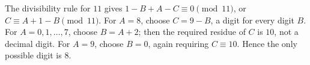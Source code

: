 The divisibility rule for $11$ gives $1-B+A-C\equiv0\pmod{11}$, or $C\equiv A+1-B\pmod{11}$. For $A=8$, choose $C=9-B$, a digit for every digit $B$.
For $A=0,1,\ldots,7$, choose $B=A+2$; then the required residue of $C$ is $10$, not a decimal digit. For $A=9$, choose $B=0$, again requiring $C\equiv10$. Hence the only possible digit is $\boxed8$.
